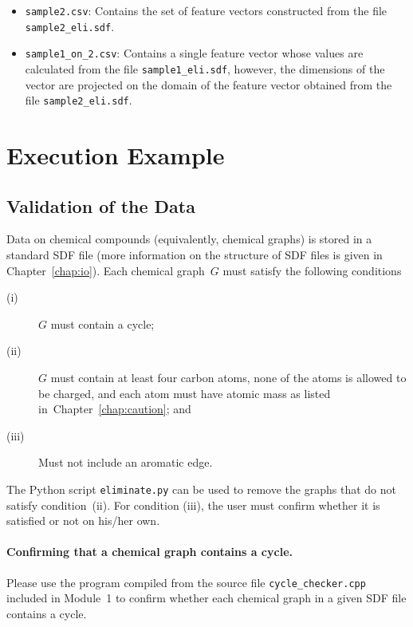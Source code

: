 \documentclass[11pt,titlepage,dvipdfmx,twoside]{book}
\newcommand{\chapref}[1]{Chapter~\ref{chap:#1}}
\begin{document}
{\begin{itemize}
\begin{itemize}
    An SDF file obtained as the output of the Python script 
  {\tt eliminate.py} when invoked on the file {\tt sample2.sdf}.
  The contents of the files {\tt sample2.sdf} and {\tt sample2\_eli.sdf}
  should be identical.
  \item {\tt sample2.csv}: 
  Contains the set of feature vectors
  constructed from the file
  {\tt sample2\_eli.sdf}.
  \item {\tt sample1\_on\_2.csv}: 
  Contains a single feature vector whose values are calculated
  from the file
  {\tt sample1\_eli.sdf},
  however, the dimensions of the vector are projected 
  on the domain of the feature vector obtained from
  the file {\tt sample2\_eli.sdf}. 
  \end{itemize}
\end{itemize}
}

\section{Execution Example}
\label{chap:quick}

\subsection{Validation of the Data}
%
Data on chemical compounds (equivalently, chemical graphs) is stored in a standard SDF file
(more information on the structure of SDF files is given in \chapref{io}).
Each chemical graph~$G$ 
must satisfy the following conditions
%
\begin{description}
\item[(i)] 
 $G$ must contain a cycle;
%
\item[(ii)] 
 $G$ must contain at least four carbon atoms,
 none of the atoms is allowed to be charged,
 and each atom must have atomic mass as listed
 in~\chapref{caution}; and
\item[(iii)] Must not include an aromatic edge.
\end{description}
%

The Python script {\tt eliminate.py}
can be used to remove the graphs that do not satisfy 
condition~(ii). %
For condition (iii),
the user must confirm whether it is satisfied or not
on his/her own. 

\paragraph{Confirming that a chemical graph contains a cycle.}
%
Please use the program compiled from the source file  
{\tt cycle\_checker.cpp}
included in Module~1 to confirm whether each chemical graph in a given
SDF file contains a cycle.
\end{document}
